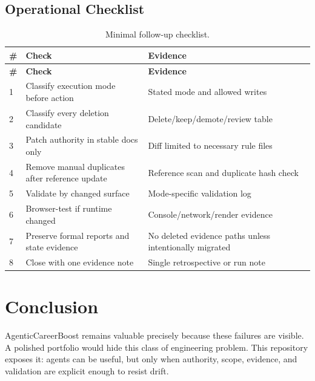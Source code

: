 \documentclass[a4paper,11pt,openany]{report}
\begin{document}
\section{Operational Checklist}

\begin{longtable}{p{} p{} p{}}
\caption{Minimal follow-up checklist.}
\label{tab:followup-checklist}\\
\toprule
\textbf{\#} & \textbf{Check} & \textbf{Evidence} \\
\midrule
\endfirsthead
\toprule
\textbf{\#} & \textbf{Check} & \textbf{Evidence} \\
\midrule
\endhead
1 & Classify execution mode before action & Stated mode and allowed writes \\
2 & Classify every deletion candidate & Delete/keep/demote/review table \\
3 & Patch authority in stable docs only & Diff limited to necessary rule files \\
4 & Remove manual duplicates after reference update & Reference scan and duplicate hash check \\
5 & Validate by changed surface & Mode-specific validation log \\
6 & Browser-test if runtime changed & Console/network/render evidence \\
7 & Preserve formal reports and state evidence & No deleted evidence paths unless intentionally migrated \\
8 & Close with one evidence note & Single retrospective or run note \\
\bottomrule
\end{longtable}

\chapter{Conclusion}
\label{ch:conclusion}


AgenticCareerBoost remains valuable precisely because these failures are visible.
A polished portfolio would hide this class of engineering problem. This
repository exposes it: agents can be useful, but only when authority, scope,
evidence, and validation are explicit enough to resist drift.
\end{document}
